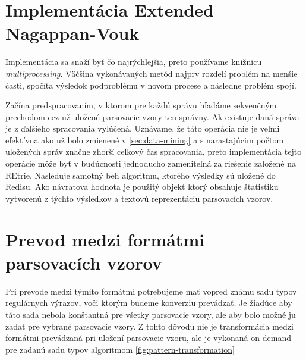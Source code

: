 \section{Implementácia Extended Nagappan-Vouk}
Implementácia sa snaží byť čo najrýchlejšia, preto používame knižnicu \emph{multiprocessing}. Väčšina vykonávaných metód najprv rozdelí problém na menšie časti, spočíta výsledok podproblému v novom procese a následne problém spojí. 
\par  Začína predspracovaním, v ktorom pre každú správu hľadáme sekvenčným prechodom cez už uložené parsovacie vzory ten správny. Ak existuje daná správa je z ďalšieho spracovania vylúčená. Uznávame, že táto operácia nie je veľmi efektívna ako už bolo zmienené v \ref{sec:data-mining} a s narastajúcim počtom uložených správ značne zhorší celkový čas spracovania, preto implementácia tejto operácie môže byť v budúcnosti  jednoducho zameniteľná za riešenie založené na REtrie. Nasleduje samotný beh algoritmu, ktorého výsledky sú uložené do Redisu. Ako návratova hodnota je použitý objekt ktorý obsahuje štatistiku vytvorenú z týchto výsledkov a textovú reprezentáciu parsovacích vzorov.

\section{Prevod medzi formátmi parsovacích vzorov}
\label{sec:format-transformation}

Pri prevode medzi týmito formátmi potrebujeme mať vopred známu sadu typov regulárnych výrazov, voči ktorým budeme konverziu prevádzať. Je žiadúce aby táto sada nebola konštantná pre všetky parsovacie vzory, ale aby bolo možné ju zadať pre vybrané parsovacie vzory. Z tohto dôvodu nie je transformácia medzi formátmi prevádzaná pri uložení parsovacie vzoru, ale je vykonaná on demand pre zadanú sadu typov algoritmom \ref{fig:pattern-transformation}

